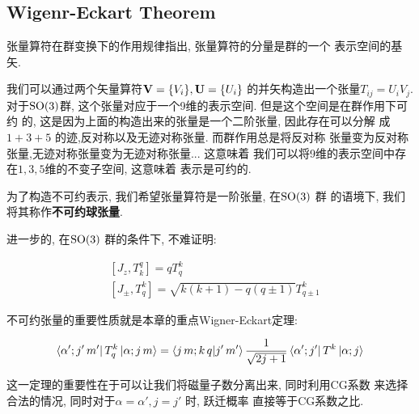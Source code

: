 \subsection{Wigenr-Eckart Theorem}

张量算符在群变换下的作用规律指出, 张量算符的分量是群的一个
表示空间的基矢.

我们可以通过两个矢量算符${\bf V} = \{V_{i}\}, {\bf U} = \{U_{i}\}$ 
的并矢构造出一个张量$T_{ij} = U_{i}V_{j}$. 对于${\rm SO}(3)$群,
这个张量对应于一个9维的表示空间. 但是这个空间是在群作用下可约
的, 这是因为上面的构造出来的张量是一个二阶张量, 因此存在可以分解
成 $1+3+5$ 的迹,反对称以及无迹对称张量. 而群作用总是将反对称
张量变为反对称张量,无迹对称张量变为无迹对称张量... 这意味着
我们可以将9维的表示空间中存在$1,3,5$维的不变子空间, 这意味着
表示是可约的.

为了构造不可约表示, 我们希望张量算符是一阶张量, 在${\rm SO}(3)$ 群
的语境下, 我们将其称作{\bf 不可约球张量}.

进一步的, 在${\rm SO}(3)$ 群的条件下, 不难证明:

\begin{equation}
  \begin{aligned}
    &[J_{z}, T^{q}_{k}] = q T^{k}_{q}\\
    &[J_{\pm}, T^{k}_{q}] = \sqrt{k(k+1) - q(q\pm 1)} T^{k}_{q\pm 1}
  \end{aligned}
\end{equation}

不可约张量的重要性质就是本章的重点Wigner-Eckart定理:

\begin{theorem}
  \begin{equation}
    \begin{aligned}
      \bra{\alpha';j'\,m'}T^{k}_{q}\ket{\alpha;j\,m} = \bra{j\,m;k\,q}\ket{j'\,m'}\frac{1}{\sqrt{2j+1}}\bra{\alpha';j'}T^{k}\ket{\alpha;j}
    \end{aligned}
  \end{equation}
\end{theorem}

这一定理的重要性在于可以让我们将磁量子数分离出来, 同时利用CG系数
来选择合法的情况, 同时对于$\alpha=\alpha', j=j'$ 时, 跃迁概率
直接等于CG系数之比.
